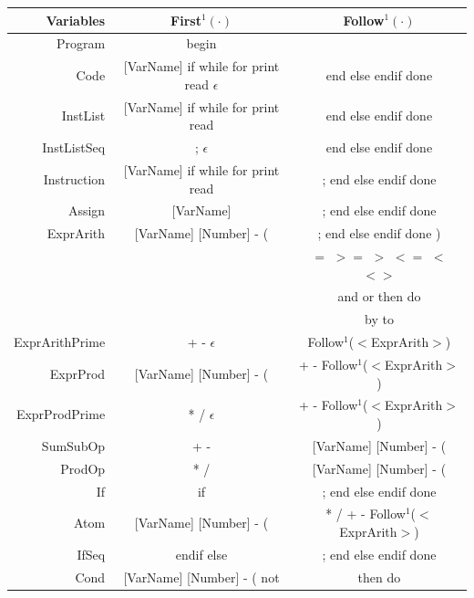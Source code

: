 \documentclass[letterpaper]{article}
\begin{document}
\begin{center}
    \renewcommand{\arraystretch}{1.5}
    \begin{tabular}{| r || c | c |}
        \hline
        \textbf{Variables} & \textbf{First$^1(\cdot)$}
        & \textbf{Follow$^1(\cdot)$} \\
        \hline
        \hline
        Program & begin & \\
        \hline
        Code & [VarName] if while for print read $\epsilon$ &
        end else endif done \\
        \hline
        InstList & [VarName] if while for print read &
        end else endif done \\
        \hline
        InstListSeq & ; $\epsilon$ &
        end else endif done \\
        \hline
        Instruction & [VarName] if while for print read &
        ; end else endif done \\
        \hline
        Assign & [VarName] &
        ; end else endif done \\
        \hline
        ExprArith & [VarName] [Number] - ( &
        ; end else endif done ) \\
        & & $=$ $>=$ $>$ $<=$ $<$ $<>$ \\
        & & and or then do \\
        & &  by to\\
        \hline
        ExprArithPrime & + - $\epsilon$ &
        Follow$^1$($<$ExprArith$>$) \\
        \hline
        ExprProd & [VarName] [Number] - ( &
        + - Follow$^1$($<$ExprArith$>$) \\
        \hline
        ExprProdPrime & * / $\epsilon$ &
        + - Follow$^1$($<$ExprArith$>$) \\
        \hline
        SumSubOp & + - & [VarName] [Number] - ( \\
        \hline
        ProdOp & * / & [VarName] [Number] - ( \\
        \hline
        If & if & ; end else endif done \\
        \hline
        Atom & [VarName] [Number] - ( &
        * / + - Follow$^1$($<$ExprArith$>$) \\
        \hline
        IfSeq & endif else & ; end else endif done \\
        \hline
        Cond & [VarName] [Number] - ( not & then do \\
        \hline

\end{tabular}
\end{center}
\end{document}
